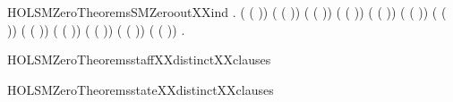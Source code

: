 \begin{SaveVerbatim}{HOLSMZeroTheoremsSMZerooutXXind}
\HOLTokenTurnstile{} \HOLSymConst{\HOLTokenForall{}}.
       ( ( )) \HOLSymConst{\HOLTokenConj{}}   ( ( )) \HOLSymConst{\HOLTokenConj{}}
       ( ( )) \HOLSymConst{\HOLTokenConj{}}   ( ( )) \HOLSymConst{\HOLTokenConj{}}
       ( ( )) \HOLSymConst{\HOLTokenConj{}}   ( ( )) \HOLSymConst{\HOLTokenConj{}}
       ( ( )) \HOLSymConst{\HOLTokenConj{}}   ( ( )) \HOLSymConst{\HOLTokenConj{}}
       ( ( )) \HOLSymConst{\HOLTokenConj{}}   ( ( )) \HOLSymConst{\HOLTokenConj{}}
       ( ( )) \HOLSymConst{\HOLTokenConj{}}   ( ( )) \HOLSymConst{\HOLTokenConj{}}
        \HOLSymConst{\HOLTokenConj{}}    \HOLSymConst{\HOLTokenImp{}}
     \HOLSymConst{\HOLTokenForall{}} .   
\end{SaveVerbatim}
\newcommand{\HOLSMZeroTheoremsSMZerooutXXind}{\UseVerbatim{HOLSMZeroTheoremsSMZerooutXXind}}
\begin{SaveVerbatim}{HOLSMZeroTheoremsstaffXXdistinctXXclauses}
\HOLTokenTurnstile{}  \HOLSymConst{\HOLTokenNotEqual{}}  \HOLSymConst{\HOLTokenConj{}}  \HOLSymConst{\HOLTokenNotEqual{}}  \HOLSymConst{\HOLTokenConj{}}  \HOLSymConst{\HOLTokenNotEqual{}} 
\end{SaveVerbatim}
\newcommand{\HOLSMZeroTheoremsstaffXXdistinctXXclauses}{\UseVerbatim{HOLSMZeroTheoremsstaffXXdistinctXXclauses}}
\begin{SaveVerbatim}{HOLSMZeroTheoremsstateXXdistinctXXclauses}
\HOLTokenTurnstile{}  \HOLSymConst{\HOLTokenNotEqual{}} 
\end{SaveVerbatim}
